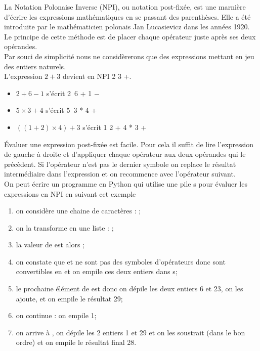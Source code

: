 \documentclass[a4paper,12pt,french]{article}
\begin{document}
\begin{exercice}
La Notation Polonaise Inverse (NPI), ou notation post-fixée, est une marnière d’écrire les expressions mathématiques en se passant des parenthèses. Elle a été introduite par le mathématicien polonais Jan Lucasievicz dans les années 1920.\\
Le principe de cette méthode est de placer chaque opérateur juste après ses deux opérandes.\\
Par souci de simplicité nous ne considèrerons que des expressions mettant en jeu des entiers naturels.\\

L’expression $2 + 3$ devient en NPI  2 3 +.
\begin{itemize}
	\item $2 + 6 − 1 $ s’écrit  2\ 6 + 1 −
	\item $5 \times 3 + 4$ s’écrit  5\ 3 * 4 +
	\item $((1 + 2) \times 4) + 3$ s’écrit 1 2 + 4 * 3 +
\end{itemize}

\'Evaluer une expression post-fixée est facile. Pour cela il suffit de lire l’expression de gauche à
droite et d’appliquer chaque opérateur aux deux opérandes qui le précèdent. Si l’opérateur n’est
pas le dernier symbole on replace le résultat intermédiaire dans l’expression et on recommence avec
l’opérateur suivant.\\

On peut écrire un programme en Python qui utilise une pile s pour évaluer les expressions en NPI en suivant cet exemple
\begin{enumerate}[--]
	\item 	on considère une chaine de caractères : ;
	\item 	on la transforme en une liste : ;
	\item 	la valeur de  est alors \pythoninline{['23', '6', '+', '1', '-']};
	\item 	on constate que  et  ne sont pas des symboles d'opérateurs donc sont convertibles en  et on empile ces deux entiers dans s;
 	\item 	le prochaine élément de  est  donc on dépile les deux entiers 6 et 23, on les ajoute, et on empile le résultat 29;
 	\item	on continue : on empile 1;
 	\item	on arrive à , on dépile les 2 entiers  1 et 29 et on les soustrait (dans le bon ordre) et on empile le résultat final 28.
\end{enumerate}


\end{exercice}
\end{document}
